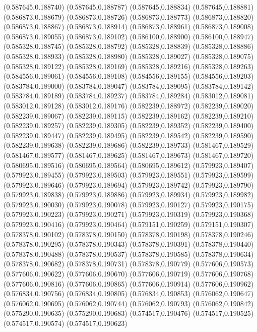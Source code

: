 (0.587645,0.188740)
(0.587645,0.188787)
(0.587645,0.188834)
(0.587645,0.188881)
(0.586873,0.188679)
(0.586873,0.188726)
(0.586873,0.188773)
(0.586873,0.188820)
(0.586873,0.188867)
(0.586873,0.188914)
(0.586873,0.188961)
(0.586873,0.189008)
(0.586873,0.189055)
(0.586873,0.189102)
(0.586100,0.188900)
(0.586100,0.188947)
(0.585328,0.188745)
(0.585328,0.188792)
(0.585328,0.188839)
(0.585328,0.188886)
(0.585328,0.188933)
(0.585328,0.188980)
(0.585328,0.189027)
(0.585328,0.189075)
(0.585328,0.189122)
(0.585328,0.189169)
(0.585328,0.189216)
(0.585328,0.189263)
(0.584556,0.189061)
(0.584556,0.189108)
(0.584556,0.189155)
(0.584556,0.189203)
(0.583784,0.189000)
(0.583784,0.189047)
(0.583784,0.189095)
(0.583784,0.189142)
(0.583784,0.189189)
(0.583784,0.189237)
(0.583784,0.189284)
(0.583012,0.189081)
(0.583012,0.189128)
(0.583012,0.189176)
(0.582239,0.188972)
(0.582239,0.189020)
(0.582239,0.189067)
(0.582239,0.189115)
(0.582239,0.189162)
(0.582239,0.189210)
(0.582239,0.189257)
(0.582239,0.189305)
(0.582239,0.189352)
(0.582239,0.189400)
(0.582239,0.189447)
(0.582239,0.189495)
(0.582239,0.189542)
(0.582239,0.189590)
(0.582239,0.189638)
(0.582239,0.189686)
(0.582239,0.189733)
(0.581467,0.189529)
(0.581467,0.189577)
(0.581467,0.189625)
(0.581467,0.189673)
(0.581467,0.189720)
(0.580695,0.189516)
(0.580695,0.189564)
(0.580695,0.189612)
(0.579923,0.189407)
(0.579923,0.189455)
(0.579923,0.189503)
(0.579923,0.189551)
(0.579923,0.189599)
(0.579923,0.189646)
(0.579923,0.189694)
(0.579923,0.189742)
(0.579923,0.189790)
(0.579923,0.189838)
(0.579923,0.189886)
(0.579923,0.189934)
(0.579923,0.189982)
(0.579923,0.190030)
(0.579923,0.190078)
(0.579923,0.190127)
(0.579923,0.190175)
(0.579923,0.190223)
(0.579923,0.190271)
(0.579923,0.190319)
(0.579923,0.190368)
(0.579923,0.190416)
(0.579923,0.190464)
(0.579151,0.190259)
(0.579151,0.190307)
(0.578378,0.190102)
(0.578378,0.190150)
(0.578378,0.190198)
(0.578378,0.190246)
(0.578378,0.190295)
(0.578378,0.190343)
(0.578378,0.190391)
(0.578378,0.190440)
(0.578378,0.190488)
(0.578378,0.190537)
(0.578378,0.190585)
(0.578378,0.190634)
(0.578378,0.190682)
(0.578378,0.190731)
(0.578378,0.190779)
(0.577606,0.190573)
(0.577606,0.190622)
(0.577606,0.190670)
(0.577606,0.190719)
(0.577606,0.190768)
(0.577606,0.190816)
(0.577606,0.190865)
(0.577606,0.190914)
(0.577606,0.190962)
(0.576834,0.190756)
(0.576834,0.190805)
(0.576834,0.190853)
(0.576062,0.190647)
(0.576062,0.190695)
(0.576062,0.190744)
(0.576062,0.190793)
(0.576062,0.190842)
(0.575290,0.190635)
(0.575290,0.190683)
(0.574517,0.190476)
(0.574517,0.190525)
(0.574517,0.190574)
(0.574517,0.190623)
